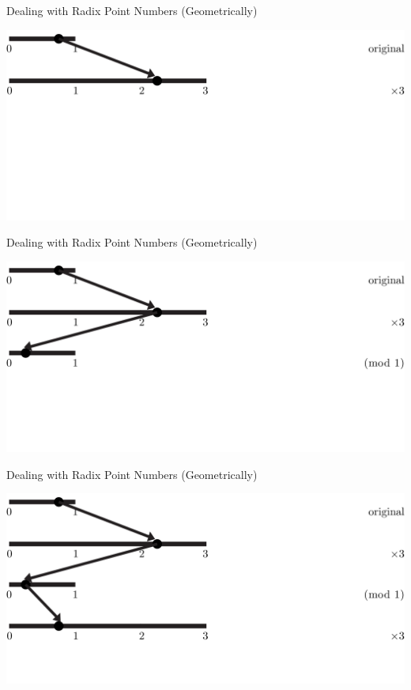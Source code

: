 \documentclass{beamer}
\begin{document}
\begin{frame}{Dealing with Radix Point Numbers (Geometrically)}
  \begin{example}
    \includegraphics[width=\textwidth,height=0.75\textheight]{images/Ternary/2}
  \end{example}
\end{frame}

\begin{frame}{Dealing with Radix Point Numbers (Geometrically)}
  \begin{example}
    \includegraphics[width=\textwidth,height=0.75\textheight]{images/Ternary/3}
  \end{example}
\end{frame}

\begin{frame}{Dealing with Radix Point Numbers (Geometrically)}
  \begin{example}
    \includegraphics[width=\textwidth,height=0.75\textheight]{images/Ternary/4}
  \end{example}
\end{frame}
\end{document}
